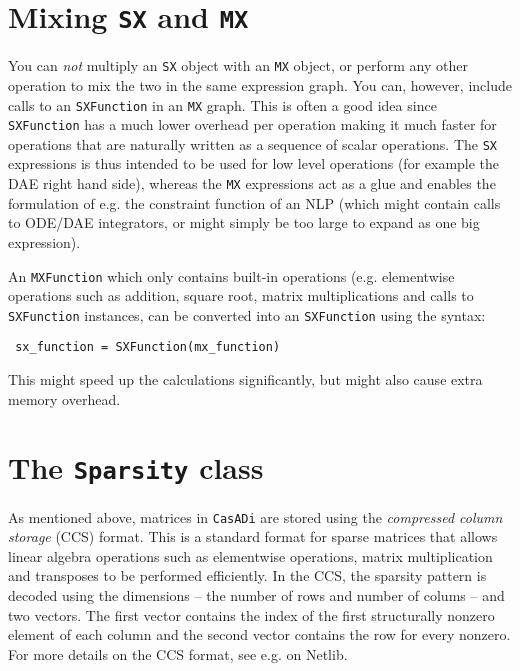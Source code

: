 \documentclass[a4paper,12pt]{book}
\newcommand{\CasADi}{\texttt{CasADi}\xspace}
\begin{document}
\section{Mixing \texttt{SX} and \texttt{MX}}
You can \emph{not} multiply an \texttt{SX} object with an \texttt{MX} object, or perform any other operation to mix the two in the same expression graph. You can, however, include calls to an \texttt{SXFunction} in an \texttt{MX} graph. This is often a good idea since \texttt{SXFunction} has a much lower overhead per operation making it much faster for operations that are naturally written as a sequence of scalar operations. The \texttt{SX} expressions is thus intended to be used for low level operations (for example the DAE right hand side), whereas the \texttt{MX} expressions act as a glue and enables the formulation of e.g. the constraint function of an NLP (which might contain calls to ODE/DAE integrators, or might simply be too large to expand as one big expression).

An \texttt{MXFunction} which only contains built-in operations (e.g. elementwise operations such as addition, square root, matrix multiplications and calls to \texttt{SXFunction} instances, can be converted into an \texttt{SXFunction} using the syntax:
\begin{verbatim}
 sx_function = SXFunction(mx_function)
\end{verbatim}

This might speed up the calculations significantly, but might also cause extra memory overhead.

\section{The \texttt{Sparsity} class} \label{sec:sparsity_class}
As mentioned above, matrices in \CasADi are stored using the \emph{compressed column storage} (CCS) format. This is a standard format for sparse matrices that allows linear algebra operations such as elementwise operations, matrix multiplication and transposes to be performed efficiently. In the CCS, the sparsity pattern is decoded using the dimensions -- the number of rows and number of colums -- and two vectors. The first vector contains the index of the first structurally nonzero element of each column and the second vector contains the row for every nonzero. For more details on the CCS format, see e.g.  on Netlib.
\end{document}

